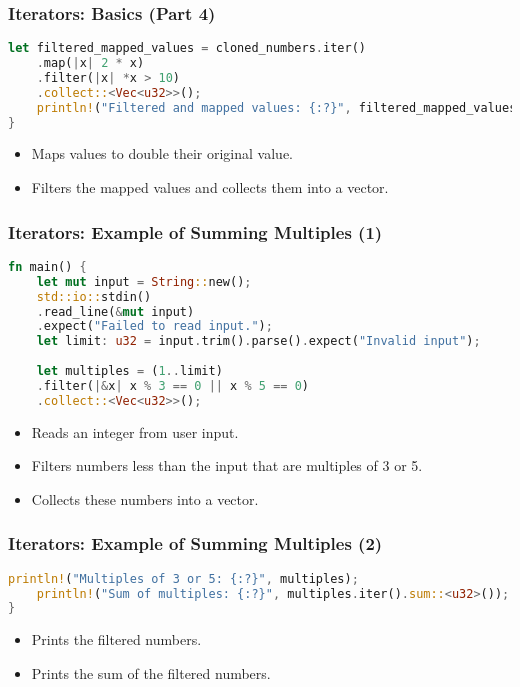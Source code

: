 \documentclass[aspectratio=169, table]{beamer}
\begin{document}
\begin{frame}[fragile]
\frametitle{Iterators: Basics (Part 4)}
\begin{lstlisting}[language=Rust]
	let filtered_mapped_values = cloned_numbers.iter()
	.map(|x| 2 * x)
	.filter(|x| *x > 10)
	.collect::<Vec<u32>>();
	println!("Filtered and mapped values: {:?}", filtered_mapped_values);
}
\end{lstlisting}
\begin{itemize}
\item Maps values to double their original value.
\item Filters the mapped values and collects them into a vector.
\end{itemize}
\end{frame}


\begin{frame}[fragile]
\frametitle{Iterators: Example of Summing Multiples (1)}
\begin{lstlisting}[language=Rust]
fn main() {
	let mut input = String::new();
	std::io::stdin()
	.read_line(&mut input)
	.expect("Failed to read input.");
	let limit: u32 = input.trim().parse().expect("Invalid input");
	
	let multiples = (1..limit)
	.filter(|&x| x % 3 == 0 || x % 5 == 0)
	.collect::<Vec<u32>>();
\end{lstlisting}
\begin{itemize}
	\item Reads an integer from user input.
	\item Filters numbers less than the input that are multiples of 3 or 5.
	\item Collects these numbers into a vector.
\end{itemize}
\end{frame}

\begin{frame}[fragile]
\frametitle{Iterators: Example of Summing Multiples (2)}
\begin{lstlisting}[language=Rust]
	println!("Multiples of 3 or 5: {:?}", multiples);
	println!("Sum of multiples: {:?}", multiples.iter().sum::<u32>());
}
\end{lstlisting}
\begin{itemize}
\item Prints the filtered numbers.
\item Prints the sum of the filtered numbers.
\end{itemize}
\end{frame}
\end{document}
